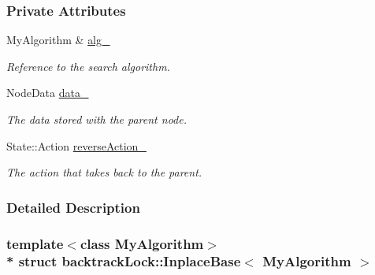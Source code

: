 \subsubsection*{Private Attributes}
\begin{DoxyCompactItemize}
\item 
My\+Algorithm \& \hyperlink{structbacktrackLock_1_1InplaceBase_a3ddd1f61b697f33f5fae731b2cf8c393}{alg\+\_\+}\hypertarget{structbacktrackLock_1_1InplaceBase_a3ddd1f61b697f33f5fae731b2cf8c393}{}\label{structbacktrackLock_1_1InplaceBase_a3ddd1f61b697f33f5fae731b2cf8c393}

\begin{DoxyCompactList}\small\item\em Reference to the search algorithm. \end{DoxyCompactList}\item 
Node\+Data \hyperlink{structbacktrackLock_1_1InplaceBase_aa040b685f610f8f7801245f0ed70484b}{data\+\_\+}\hypertarget{structbacktrackLock_1_1InplaceBase_aa040b685f610f8f7801245f0ed70484b}{}\label{structbacktrackLock_1_1InplaceBase_aa040b685f610f8f7801245f0ed70484b}

\begin{DoxyCompactList}\small\item\em The data stored with the parent node. \end{DoxyCompactList}\item 
State\+::\+Action \hyperlink{structbacktrackLock_1_1InplaceBase_af155aab0e59eafdc5e5861af751edf9a}{reverse\+Action\+\_\+}\hypertarget{structbacktrackLock_1_1InplaceBase_af155aab0e59eafdc5e5861af751edf9a}{}\label{structbacktrackLock_1_1InplaceBase_af155aab0e59eafdc5e5861af751edf9a}

\begin{DoxyCompactList}\small\item\em The action that takes back to the parent. \end{DoxyCompactList}\end{DoxyCompactItemize}


\subsubsection{Detailed Description}
\subsubsection*{template$<$class My\+Algorithm$>$\\*
struct backtrack\+Lock\+::\+Inplace\+Base$<$ My\+Algorithm $>$}


